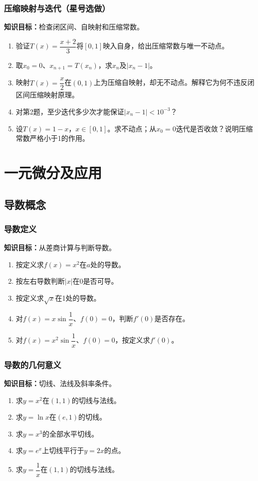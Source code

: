 \documentclass[11pt,a4paper,fontset=fandol]{ctexrep}
\newcommand{\goal}[1]{\textbf{知识目标：}#1\par}
\begin{document}
\subsection{压缩映射与迭代（星号选做）}
\goal{检查闭区间、自映射和压缩常数。}
\begin{enumerate}
\item 验证$T(x)=\dfrac{x+2}{3}$将$[0,1]$映入自身，给出压缩常数与唯一不动点。
\item 取$x_0=0$、$x_{n+1}=T(x_n)$，求$x_n$及$|x_n-1|$。
\item 映射$T(x)=\dfrac{x}{2}$在$(0,1)$上为压缩自映射，却无不动点。解释它为何不违反闭区间压缩映射原理。
\item 对第2题，至少迭代多少次才能保证$|x_n-1|<10^{-3}$？
\item 设$T(x)=1-x$，$x\in[0,1]$。求不动点；从$x_0=0$迭代是否收敛？说明压缩常数严格小于1的作用。
\end{enumerate}
\chapter{一元微分及应用}
\section{导数概念}
\subsection{导数定义}
\goal{从差商计算与判断导数。}
\begin{enumerate}
\item 按定义求$f(x)=x^2$在$a$处的导数。
\item 按左右导数判断$|x|$在0是否可导。
\item 按定义求$\sqrt x$在1处的导数。
\item 对$f(x)=x\sin\dfrac{1}{x}$、$f(0)=0$，判断$f'(0)$是否存在。
\item 对$f(x)=x^2\sin\dfrac{1}{x}$、$f(0)=0$，按定义求$f'(0)$。
\end{enumerate}
\subsection{导数的几何意义}
\goal{切线、法线及斜率条件。}
\begin{enumerate}
\item 求$y=x^2$在$(1,1)$的切线与法线。
\item 求$y=\ln x$在$(e,1)$的切线。
\item 求$y=x^3$的全部水平切线。
\item 求$y=e^x$上切线平行于$y=2x$的点。
\item 求$y=\dfrac{1}{x}$在$(1,1)$的切线与法线。
\end{enumerate}
\end{document}
